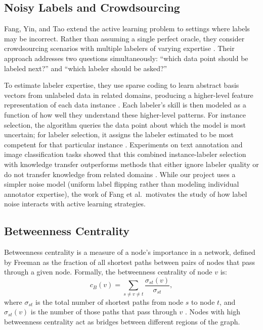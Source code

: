 \documentclass[12pt]{article}
\begin{document}
\subsection{Noisy Labels and Crowdsourcing}

Fang, Yin, and Tao \cite{Fang2014} extend the active learning problem to settings where labels may be incorrect. Rather than assuming a single perfect oracle, they consider crowdsourcing scenarios with multiple labelers of varying expertise \cite{Fang2014}. Their approach addresses two questions simultaneously: ``which data point should be labeled next?'' and ``which labeler should be asked?''

To estimate labeler expertise, they use sparse coding to learn abstract basis vectors from unlabeled data in related domains, producing a higher-level feature representation of each data instance \cite{Fang2014}. Each labeler's skill is then modeled as a function of how well they understand these higher-level patterns. For instance selection, the algorithm queries the data point about which the model is most uncertain; for labeler selection, it assigns the labeler estimated to be most competent for that particular instance \cite{Fang2014}. Experiments on text annotation and image classification tasks showed that this combined instance-labeler selection with knowledge transfer outperforms methods that either ignore labeler quality or do not transfer knowledge from related domains \cite{Fang2014}. While our project uses a simpler noise model (uniform label flipping rather than modeling individual annotator expertise), the work of Fang et al.\ motivates the study of how label noise interacts with active learning strategies.

\subsection{Betweenness Centrality}

Betweenness centrality is a measure of a node's importance in a network, defined by Freeman \cite{Freeman1977} as the fraction of all shortest paths between pairs of nodes that pass through a given node. Formally, the betweenness centrality of node $v$ is:
\[
c_B(v) = \sum_{s \neq v \neq t} \frac{\sigma_{st}(v)}{\sigma_{st}},
\]
where $\sigma_{st}$ is the total number of shortest paths from node $s$ to node $t$, and $\sigma_{st}(v)$ is the number of those paths that pass through $v$ \cite{Freeman1977}. Nodes with high betweenness centrality act as bridges between different regions of the graph.
\end{document}
